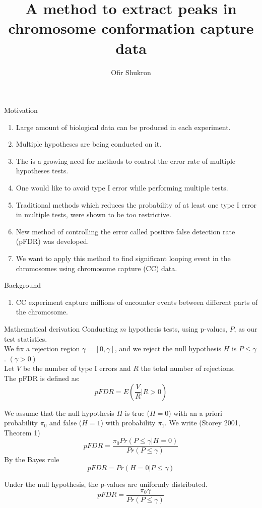 \documentclass[8pt]{beamer}
\title{A method to extract peaks in chromosome conformation capture data}
\author{Ofir Shukron}
\begin{document}
\begin{frame}
\titlepage
\end{frame}

\begin{frame}{Motivation}
\begin{enumerate}
\item Large amount of biological data can be produced in each experiment. 
\item Multiple hypotheses are being conducted on it.
\item The is a growing need for methods to control the error rate of multiple hypotheses tests.
\item One would like to avoid type I error while performing multiple tests. 
\item Traditional methods which reduces the probability of at least one type I error in multiple tests, were shown to be too restrictive.
\item New method of controlling the error called positive false detection rate (pFDR) was developed. 
\item We want to apply this method to find significant looping event in the chromosomes using chromosome capture (CC) data.
\end{enumerate}
\end{frame}

\begin{frame}{Background}
\begin{enumerate}
\item CC experiment capture millions of encounter events between different parts of the chromosome. 
\end{enumerate}
\end{frame}

\begin{frame}{Mathematical derivation}
Conducting $m$ hypothesis tests, using p-values, $P$, as our test statistics.\\
We fix a rejection region $\gamma=[0, \gamma]$, and we reject the null hypothesis $H$ is $P\leq\gamma$. $(\gamma>0)$\\
Let $V$ be the number of type I errors and $R$ the total number of rejections.\\
The pFDR is defined as: 
\begin{equation*}
pFDR=E\left(\frac{V}{R}| R>0 \right)
\end{equation*}

We assume that the null hypothesis $H$ is true ($H=0$) with an a priori probability $\pi_0$ and false ($H=1$) with probability $\pi_1$. We write (Storey 2001, Theorem 1)\\
\begin{equation*}
pFDR=\frac{\pi_0 Pr(P\leq\gamma|H=0)}{Pr(P\leq\gamma)}
\end{equation*}
By the Bayes rule 
\begin{equation*}
pFDR = Pr(H=0|P\leq\gamma)
\end{equation*}

Under the null hypothesis, the p-values are uniformly distributed. 
\begin{equation*}
pFDR=\frac{\pi_0\gamma}{Pr(P\leq\gamma)}
\end{equation*} 
\end{frame}
\end{document}
